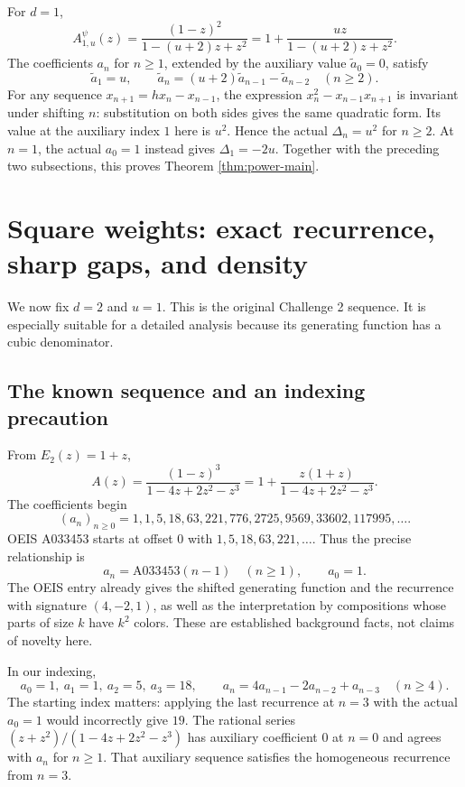 \documentclass[11pt,letterpaper]{article}
\theoremstyle{definition}
\newcommand{\Delt}{\Delta}
\numberwithin{equation}{section}
\begin{document}
For $d=1$,
\begin{equation}\label{eq:d1}
A^\psi_{1,u}(z)=\frac{(1-z)^2}{1-(u+2)z+z^2}
=1+\frac{uz}{1-(u+2)z+z^2}.
\end{equation}
The coefficients $a_n$ for $n\ge1$, extended by the auxiliary value
$\widetilde a_0=0$, satisfy
\[
\widetilde a_1=u,\qquad
\widetilde a_n=(u+2)\widetilde a_{n-1}-\widetilde a_{n-2}
\quad(n\ge2).
\]
For any sequence $x_{n+1}=h x_n-x_{n-1}$, the expression
$x_n^2-x_{n-1}x_{n+1}$ is invariant under shifting $n$: substitution
on both sides gives the same quadratic form.
Its value at the auxiliary index $1$ here is $u^2$. Hence the actual
$\Delt_n=u^2$ for $n\ge2$. At $n=1$, the actual $a_0=1$ instead gives
$\Delt_1=-2u$.
Together with the preceding two subsections, this proves
Theorem \ref{thm:power-main}.

\section{Square weights: exact recurrence, sharp gaps, and density}
\label{sec:squares}

We now fix $d=2$ and $u=1$. This is the original Challenge 2 sequence.
It is especially suitable for a detailed analysis because its generating
function has a cubic denominator.

\subsection{The known sequence and an indexing precaution}

From $E_2(z)=1+z$,
\begin{equation}\label{eq:square-gf}
A(z)=\frac{(1-z)^3}{1-4z+2z^2-z^3}
=1+\frac{z(1+z)}{1-4z+2z^2-z^3}.
\end{equation}
The coefficients begin
\[
(a_n)_{n\ge0}=1,1,5,18,63,221,776,2725,9569,33602,117995,\ldots.
\]
OEIS A033453 \cite{OEIS} starts at offset $0$ with
$1,5,18,63,221,\ldots$. Thus the precise relationship is
\begin{equation}\label{eq:OEIS-shift}
a_n=\mathrm{A033453}(n-1)\quad(n\ge1),\qquad a_0=1.
\end{equation}
The OEIS entry already gives the shifted generating function and the
recurrence with signature $(4,-2,1)$, as well as the interpretation by
compositions whose parts of size $k$ have $k^2$ colors.
These are established background facts, not claims of novelty here.

In our indexing,
\begin{equation}\label{eq:a-recurrence}
a_0=1,\ a_1=1,\ a_2=5,\ a_3=18,\qquad
a_n=4a_{n-1}-2a_{n-2}+a_{n-3}\quad(n\ge4).
\end{equation}
The starting index matters: applying the last recurrence at $n=3$ with
the actual $a_0=1$ would incorrectly give $19$.
The rational series $(z+z^2)/(1-4z+2z^2-z^3)$ has auxiliary coefficient
$0$ at $n=0$ and agrees with $a_n$ for $n\ge1$.
That auxiliary sequence satisfies the homogeneous recurrence from $n=3$.
\end{document}
